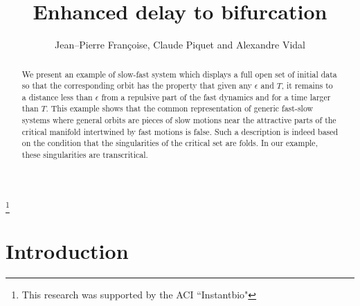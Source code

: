 \documentclass[12pt,psamsfonts]{amsart}
\begin{document}
\thispagestyle{empty} \setcounter{page}{1}

\title[Enhanced delay to bifurcation]
{Enhanced delay to bifurcation}

\author[Jean--Pierre Fran\c{c}oise, Claude Piquet  and Alexandre Vidal]
{Jean--Pierre Fran\c{c}oise, Claude Piquet  and Alexandre Vidal}

\address{Laboratoire J.-L. Lions, UMR 7598, CNRS, Universit\'e P.-M. Curie, Paris6,
Paris, France}


\thanks{This research was supported by the ACI ``Instantbio"}


\date{}
\dedicatory{}

\maketitle

\maketitle

\begin{abstract}
We present an example of slow-fast system which
displays a full open set of initial data so that the corresponding
orbit has the property that given any $\epsilon$ and $T$, it
remains to a distance less than $\epsilon$ from a repulsive part
of the fast dynamics and for a time larger than $T$. This example
shows that the common representation of generic fast-slow systems
where general orbits are pieces of slow motions near the
attractive parts of the critical manifold intertwined by fast
motions is false. Such a description is indeed based on the
condition that the singularities of the critical set are folds. In our
example, these singularities are transcritical.
\end{abstract}

\section{Introduction}
\end{document}
